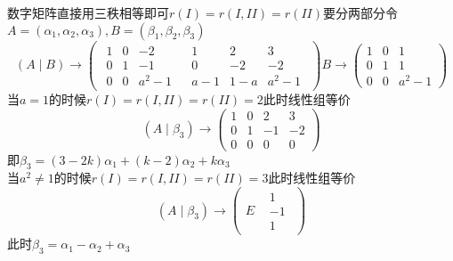 \documentclass[12pt, a4paper, oneside, UTF8]{ctexbook}
\begin{document}
\begin{enumerate}[label=\arabic*.]
    \begin{solution}
    数字矩阵直接用三秩相等即可$r(I)=r(I,II)=r(II)$要分两部分令$A=(\alpha_1,\alpha_2,\alpha_3),B=(\beta_1,\beta_2,\beta_3)$
    $$
    (A\mid B)\rightarrow \left(\begin{array}{c|c}
        \begin{matrix}
            1 & 0 & -2 \\
            0 & 1 & -1 \\
            0 & 0 & a^2 -1 
        \end{matrix} & \begin{matrix}
            1 & 2 & 3 \\
            0 & -2 & -2 \\
            a-1 & 1-a & a^2 -1 
        \end{matrix}
    \end{array}\right)
    B \rightarrow \begin{pmatrix}
        1 & 0 & 1 \\
        0 & 1 & 1 \\
        0 & 0 & a^2-1
    \end{pmatrix}
    $$
    当$a=1$的时候$r(I)=r(I,II)=r(II)=2$此时线性组等价
    $$
    (A\mid\beta_3) \rightarrow \begin{pmatrix}
        1 & 0 & 2 & 3 \\
        0 & 1 & -1 & -2 \\
        0 & 0 & 0 & 0
    \end{pmatrix}
    $$
    即$\beta_3 = (3-2k)\alpha_1+(k-2)\alpha_2+k\alpha_3$ \\
    当$a^2\neq 1$的时候$r(I)=r(I,II)=r(II)=3$此时线性组等价
    $$
    (A\mid\beta_3)\rightarrow\begin{pmatrix}
        E & \begin{matrix}
            1 \\
            -1 \\
            1
        \end{matrix}
    \end{pmatrix}
    $$
    此时$\beta_3=\alpha_1-\alpha_2+\alpha_3$
    \end{solution}
\end{enumerate}
\end{document}
